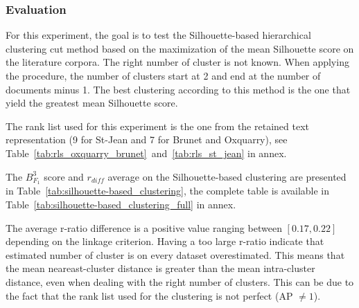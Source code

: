 \subsubsection{Evaluation}

For this experiment, the goal is to test the Silhouette-based hierarchical clustering cut method based on the maximization of the mean Silhouette score on the literature corpora.
The right number of cluster is not known.
When applying the procedure, the number of clusters start at 2 and end at the number of documents minus 1.
The best clustering according to this method is the one that yield the greatest mean Silhouette score.

The rank list used for this experiment is the one from the retained text representation (9 for St-Jean and 7 for Brunet and Oxquarry), see Table~\ref{tab:rls_oxquarry_brunet}~and~\ref{tab:rls_st_jean} in annex.

The $B^3_{F_1}$ score and $r_{diff}$ average on the Silhouette-based clustering are presented in Table~\ref{tab:silhouette-based_clustering}, the complete table is available in Table~\ref{tab:silhouette-based_clustering_full} in annex.

The average r-ratio difference is a positive value ranging between $\left[0.17, 0.22\right]$ depending on the linkage criterion.
Having a too large r-ratio indicate that estimated number of cluster is on every dataset overestimated.
This means that the mean neareast-cluster distance is greater than the mean intra-cluster distance, even when dealing with the right number of clusters.
This can be due to the fact that the rank list used for the clustering is not perfect (AP $\neq 1$).

\begin{table}
  \centering
  \caption{Silhouette-based clustering evaluation on retained rank lists, average $B^3_{F_1}$/$r_{diff}$, Maximal Silhouette ($\alpha = 0$)}
  \label{tab:silhouette-based_clustering}

\end{table}

